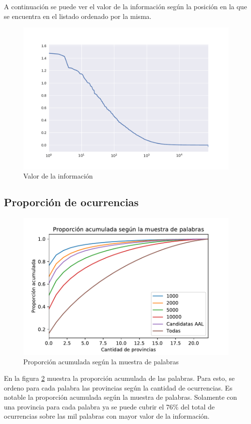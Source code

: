 A continuación se puede ver el valor de la información según la posición en la que se encuentra en el listado ordenado por la misma.

\begin{figure}[ht]
\centering
\includegraphics[scale=0.4]{./images/ivaluesLog.pdf}
\caption{Valor de la información} 
\label{fig:ivalue} 
\end{figure}


\subsection{Proporción de ocurrencias} %
\label{sub:proporcionDeOcurrencias}

\begin{figure}[ht]
\centering
\includegraphics[scale=0.4]{./images/PropAcum.pdf}
\caption{Proporción acumulada según la muestra de palabras} 
\label{fig:propAcum} 
\end{figure}
En la figura \ref{fig:propAcum} muestra la proporción acumulada de las palabras. Para esto, se ordeno para cada palabra las provincias según la cantidad de ocurrencias. Es notable la proporción acumulada según la muestra de palabras. Solamente con una provincia para cada palabra ya se puede cubrir el 76\% del total de ocurrencias sobre las mil palabras con mayor valor de la información.

